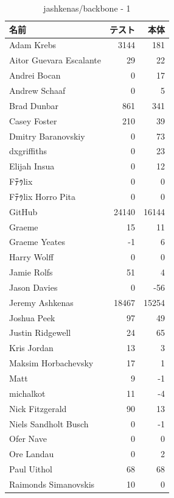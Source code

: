 \begin{table}[htb]
\begin{center}
\caption{jashkenas/backbone - 1}
\begin{tabular}{|l|r|r|} \hline 
名前 & テスト & 本体 \\ \hline \hline
Adam Krebs & 3144 & 181\\ \hline
Aitor Guevara Escalante & 29 & 22\\ \hline
Andrei Bocan & 0 & 17\\ \hline
Andrew Schaaf & 0 & 5\\ \hline
Brad Dunbar & 861 & 341\\ \hline
Casey Foster & 210 & 39\\ \hline
Dmitry Baranovskiy & 0 & 73\\ \hline
dxgriffiths & 0 & 23\\ \hline
Elijah Insua & 0 & 12\\ \hline
Fﾃｩlix & 0 & 0\\ \hline
Fﾃｩlix Horro Pita & 0 & 0\\ \hline
GitHub & 24140 & 16144\\ \hline
Graeme & 15 & 11\\ \hline
Graeme Yeates & -1 & 6\\ \hline
Harry Wolff & 0 & 0\\ \hline
Jamie Rolfs & 51 & 4\\ \hline
Jason Davies & 0 & -56\\ \hline
Jeremy Ashkenas & 18467 & 15254\\ \hline
Joshua Peek & 97 & 49\\ \hline
Justin Ridgewell & 24 & 65\\ \hline
Kris Jordan & 13 & 3\\ \hline
Maksim Horbachevsky & 17 & 1\\ \hline
Matt & 9 & -1\\ \hline
michalkot & 11 & -4\\ \hline
Nick Fitzgerald & 90 & 13\\ \hline
Niels Sandholt Busch & 0 & -1\\ \hline
Ofer Nave & 0 & 0\\ \hline
Ore Landau & 0 & 2\\ \hline
Paul Uithol & 68 & 68\\ \hline
Raimonds Simanovskis & 10 & 0\\ \hline
\end{tabular}
\end{center}
\end{table}

